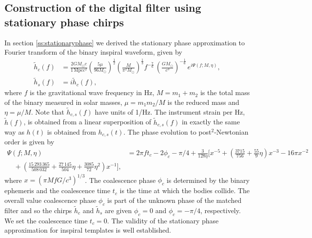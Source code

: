 \subsection{Construction of the digital filter using stationary phase chirps}
\label{ss:digitalfilter}

In section \ref{ss:stationaryphase} we derived the stationary phase
approximation to Fourier transform of the binary inspiral waveform, given by
\begin{align}
\label{eq:spcos}
\tilde{h}_c(f)&=\frac{2GM_\odot c}{1\,\mathrm{Mpc}c^2}
\left(\frac{5\mu}{96M_\odot}\right)^\frac{1}{2}
\left(\frac{M}{\pi^2M_\odot}\right)^\frac{1}{3}
f^{-\frac{7}{6}}\, \left( \frac{GM_\odot}{c^3} \right)^{-\frac{1}{6}}\,
e^{i\Psi(f;M,\eta)},\\
\tilde{h}_s(f)&=i\tilde{h}_c(f),
\label{eq:hsorthog}
\end{align}
where $f$ is the gravitational wave frequency in Hz, $M = m_1+m_2$ 
is the total mass of the binary measured in solar masses, $\mu = m_1 m_2 / M$
is the reduced mass and $\eta = \mu/M$.  Note that $\tilde{h}_{c,s}(f)$ have
units of 1/Hz.  The instrument strain per Hz, $\tilde{h}(f)$, is obtained from
a linear superposition of $\tilde{h}_{c,s}(f)$ in exactly the same way as
$h(t)$ is obtained from $h_{c,s}(t)$. The phase evolution to
post$^2$-Newtonian order is given by
\begin{equation}
\begin{split}
\Psi(f;M,\eta) &= 2\pi ft_c-2\phi_c-\pi/4+\frac{3}{128\eta}\biggl[x^{-5}+
\left(\frac{3715}{756}+\frac{55}{9}\eta\right)x^{-3}
-16\pi x^{-2} \\
\quad +\left(\frac{15\,293\,365}{508\,032}+\frac{27\,145}{504}\eta
+\frac{3085}{72}\eta^2\right)x^{-1}\biggr],
\end{split}
\end{equation}
where $x=(\pi M f G/c^3)^{1/3}$. The coalescence phase $\phi_c$ is determined
by the binary ephemeris and the coalescence time $t_c$ is the time at which
the bodies collide. The overall value coalescence phase $\phi_c$ is part of
the unknown phase of the matched filter and so the chirps $\tilde{h}_c$ and
$\tilde{h}_s$ are given $\phi_c=0$ and $\phi_c=-\pi/4$, respectively.
We set the coalescence time $t_c = 0$.  The validity of the stationary
phase approximation for inspiral templates is well
established\cite{Droz:1999qx}.

